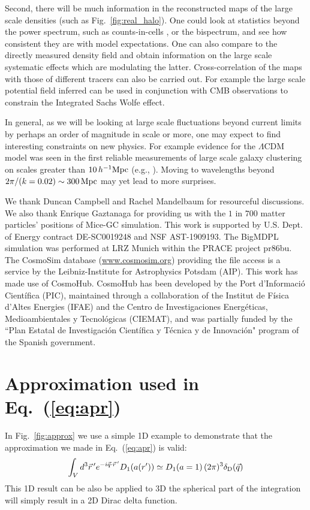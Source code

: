 \documentclass[prd,amsmath,amssymb,floatfix,superscriptaddress,nofootinbib,twocolumn]{revtex4-1}
\def\be{\begin{equation}}
\def\ee{\end{equation}}
\newcommand{\vrr}{\vec{r}}
\newcommand{\ec}[1]{Eq.~(\ref{eq:#1})}
\newcommand{\rf}[1]{\ref{fig:#1}}
\begin{document}
Second, there will be much information in the reconstructed maps of the large scale densities (such as Fig.~\rf{real_halo}). One could look at statistics beyond the power spectrum, such as counts-in-cells \cite{Yang:2011cic}, or the bispectrum, and see how consistent they are with model expectations. One can also compare to the directly measured density field and obtain information on the large scale systematic effects which are modulating the latter. Cross-correlation of the maps with those of different tracers can also be carried out. For example the large scale potential field inferred can be used in conjunction with CMB observations to constrain the Integrated Sachs Wolfe effect\cite{Nishizawa:2014vga}.

In general, as we will be looking at large scale fluctuations beyond current limits by perhaps an order of magnitude in scale or more, one may expect to find interesting constraints on new physics. For example evidence for the $\Lambda$CDM model was seen in the first reliable measurements of large scale galaxy clustering on scales greater than $10\,h^{-1}\rm Mpc$ (e.g., \cite{Efstathio:1990cdm}). Moving to wavelengths beyond $2\pi/(k=0.02) \sim 300 \rm \, Mpc$ may yet lead to more surprises.

\acknowledgements
We thank Duncan Campbell and Rachel Mandelbaum for resourceful discussions. We also thank Enrique Gaztanaga for providing us with the $1$ in $700$ matter particles' positions of Mice-GC simulation. This work is supported by U.S. Dept. of Energy contract DE-SC0019248 and NSF AST-1909193.
The BigMDPL simulation was performed at LRZ Munich within the PRACE project pr86bu. The CosmoSim database (\url{www.cosmosim.org}) providing the file access is a service by the Leibniz-Institute for Astrophysics Potsdam (AIP).
This work has made use of CosmoHub. CosmoHub has been developed by the Port d'Informació Científica (PIC), maintained through a collaboration of the Institut de Física d'Altes Energies (IFAE) and the Centro de Investigaciones Energéticas, Medioambientales y Tecnológicas (CIEMAT), and was partially funded by the ``Plan Estatal de Investigación Científica y Técnica y de Innovación" program of the Spanish government.
\clearpage

\appendix 


\noindent 
\section{Approximation used in \ec{apr}}\label{appenda}
In Fig.~\rf{approx} we use a simple 1D example to demonstrate that the approximation we made in \ec{apr} is valid:
\be 
\int_{V} d^{3}\vrr\, 'e^{-i\vec{q}\cdot \vrr\, '}{D_{1}(a(r'))}  \simeq D_{1}(a=1)\,(2\pi)^3\delta_{\rm D}(\vec{q})
\ee 
This 1D result can be also be applied to 3D the spherical part of the integration will simply result in a 2D Dirac delta function.
\end{document}
